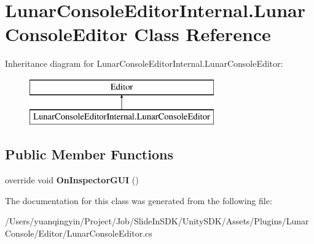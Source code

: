 \hypertarget{class_lunar_console_editor_internal_1_1_lunar_console_editor}{}\section{Lunar\+Console\+Editor\+Internal.\+Lunar\+Console\+Editor Class Reference}
\label{class_lunar_console_editor_internal_1_1_lunar_console_editor}
Inheritance diagram for Lunar\+Console\+Editor\+Internal.\+Lunar\+Console\+Editor\+:\begin{figure}[H]
\begin{center}
\leavevmode
\includegraphics[height=2.000000cm]{class_lunar_console_editor_internal_1_1_lunar_console_editor}
\end{center}
\end{figure}
\subsection*{Public Member Functions}
\begin{DoxyCompactItemize}
\item 
\mbox{\label{class_lunar_console_editor_internal_1_1_lunar_console_editor_afc741effed2b2a93ff99e934f63e5bc5}} 
override void {\bfseries On\+Inspector\+G\+UI} ()
\end{DoxyCompactItemize}


The documentation for this class was generated from the following file\+:\begin{DoxyCompactItemize}
\item 
/\+Users/yuanqingyin/\+Project/\+Job/\+Slide\+In\+S\+D\+K/\+Unity\+S\+D\+K/\+Assets/\+Plugins/\+Lunar\+Console/\+Editor/Lunar\+Console\+Editor.\+cs\end{DoxyCompactItemize}

